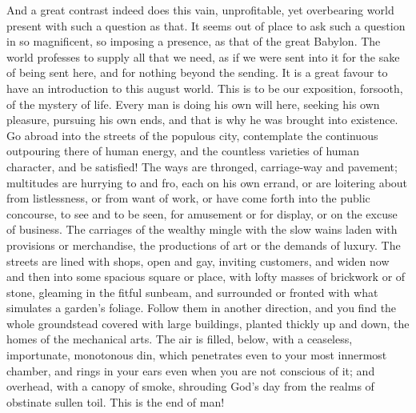 And a great contrast indeed does this vain, unprofitable, yet
overbearing world present with such a question as that. It seems out
of place to ask such a question in so magnificent, so imposing a
presence, as that of the great Babylon. The world professes to supply
all that we need, as if we were sent into it for the sake of being
sent here, and for nothing beyond the sending. It is a great favour to
have an introduction to this august world. This is to be our
exposition, forsooth, of the mystery of life. Every man is doing his
own will here, seeking his own pleasure, pursuing his own ends, and
that is why he was brought into existence. Go abroad into the streets
of the populous city, contemplate the continuous outpouring there of
human energy, and the countless varieties of human character, and be
satisfied! The ways are thronged, carriage-way and pavement;
multitudes are hurrying to and fro, each on his own errand, or are
loitering about from listlessness, or from want of work, or have come
forth into the public concourse, to see and to be seen, for amusement
or for display, or on the excuse of business. The carriages of the
wealthy mingle with the slow wains laden with provisions or
merchandise, the productions of art or the demands of luxury. The
streets are lined with shops, open and gay, inviting customers, and
widen now and then into some spacious square or place, with lofty
masses of brickwork or of stone, gleaming in the fitful sunbeam, and
surrounded or fronted with what simulates a garden's foliage. Follow
them in another direction, and you find the whole groundstead covered
with large buildings, planted thickly up and down, the homes of the
mechanical arts. The air is filled, below, with a ceaseless,
importunate, monotonous din, which penetrates even to your most
innermost chamber, and rings in your ears even when you are not
conscious of it; and overhead, with a canopy of smoke, shrouding God's
day from the realms of obstinate sullen toil. This is the end of man!

